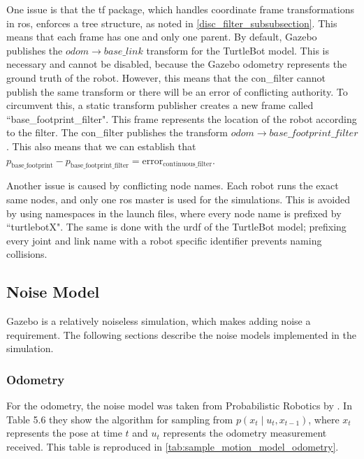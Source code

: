\documentclass[thesis.tex]{subfile}
\begin{document}
One issue is that the tf package, which handles coordinate frame transformations in \gls{ros}, enforces a tree structure, as noted in \cref{disc_filter_subsubsection}. This means that each frame has one and only one parent. By default, Gazebo publishes the $odom \rightarrow base\_link$ transform for the TurtleBot model. This is necessary and cannot be disabled, because the Gazebo odometry represents the ground truth of the robot. However, this means that the \gls{con_filter} cannot publish the same transform or there will be an error of conflicting authority. To circumvent this, a static transform publisher creates a new frame called ``base\_footprint\_filter". This frame represents the location of the robot according to the filter. The \gls{con_filter} publishes the transform $odom \rightarrow base\_footprint\_filter$. This also means that we can establish that $p_{\text{base\_footprint}} - p_{\text{base\_footprint\_filter}} = \text{error}_{\text{continuous\_filter}}$.

Another issue is caused by conflicting node names. Each robot runs the exact same nodes, and only one \gls{ros} master is used for the simulations. This is avoided by using namespaces in the launch files, where every node name is prefixed by ``turtlebotX". The same is done with the \gls{urdf} of the TurtleBot model; prefixing every joint and link name with a robot specific identifier prevents naming collisions.

\subsection{Noise Model} \label{sec:noise_model}
Gazebo is a relatively noiseless simulation, which makes adding noise a requirement. The following sections describe the noise models implemented in the simulation.

\subsubsection{Odometry}
For the odometry, the noise model was taken from Probabilistic Robotics by \textcite[136]{ProbabilisticRobotics}. In Table 5.6 they show the algorithm for sampling from $p(x_t \mid u_t, x_{t-1})$, where $x_t$ represents the pose at time $t$ and $u_t$ represents the odometry measurement received. This table is reproduced in \cref{tab:sample_motion_model_odometry}.
\end{document}
